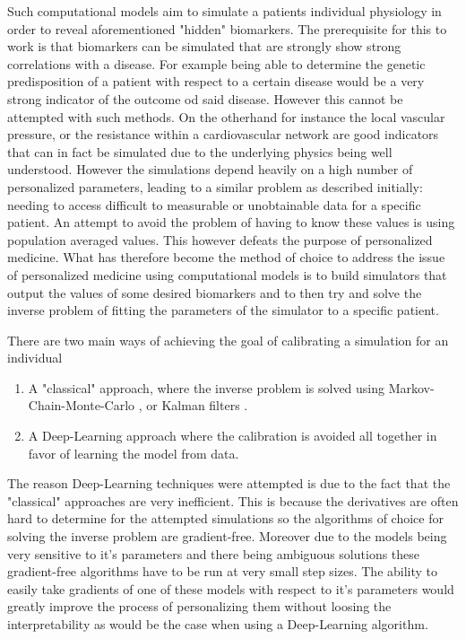 \documentclass[a4paper, oneside]{discothesis}
\begin{document}
Such computational models aim to simulate a patients individual physiology in order to reveal aforementioned "hidden" biomarkers.
The prerequisite for this to work is that biomarkers can be simulated that are strongly show strong correlations with a disease.
For example being able to determine the genetic predisposition of a patient with respect to a certain disease would be a very strong indicator of the outcome od said disease.
However this cannot be attempted with such methods.
On the otherhand for instance the local vascular pressure, or the resistance within a cardiovascular network are good indicators that can in fact be simulated due to the underlying physics being well understood.
However the simulations depend heavily on a high number of personalized parameters, leading to a similar problem as described initially: needing to access difficult to measurable or unobtainable data for a specific patient.
An attempt to avoid the problem of having to know these values is using population averaged values.
This however defeats the purpose of personalized medicine.
What has therefore become the method of choice to address the issue of personalized medicine using computational models is to build simulators that output the values of some desired biomarkers and to then try and solve the inverse problem of fitting the parameters of the simulator to a specific patient.

There are two main ways of achieving the goal of calibrating a simulation for an individual
\begin{enumerate}
	\item A "classical" approach, where the inverse problem is solved using Markov-Chain-Monte-Carlo \cite{melis2017gaussian}, or Kalman filters \cite{manganotti2022modeling}.
	\item A Deep-Learning approach where the calibration is avoided all together in favor of learning the model from data. \cite{kissas2020machine,arzani2022machine}
\end{enumerate}
The reason Deep-Learning techniques were attempted is due to the fact that the "classical" approaches are very inefficient.
This is because the derivatives are often hard to determine for the attempted simulations so the algorithms of choice for solving the inverse problem are gradient-free. 
Moreover due to the models being very sensitive to it's parameters and there being ambiguous solutions \cite{nolte2022inverse,quick2001infinite} these gradient-free algorithms have to be run at very small step sizes. \cite{taylor2009patient,tuccio2022parameter,marsden2014optimization,mineroff2019optimization,bozkurt2022patient}
The ability to easily take gradients of one of these models with respect to it's parameters would greatly improve the process of personalizing them without loosing the interpretability as would be the case when using a Deep-Learning algorithm.
\end{document}
